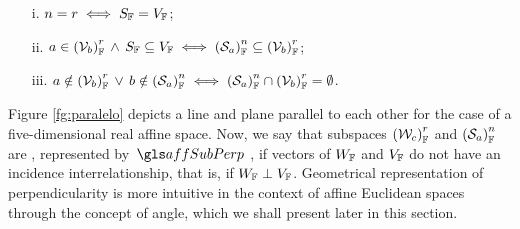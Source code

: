 \begin{itemize}
	\setlength\itemsep{.1em}
	\item[i.] $n=r\iff S_\cam{F}=V_\cam{F}$;
	\item[ii.] $a\in \eamsd{V}{F}{b}{r}\,\wedge\, S_\cam{F}\subseteq V_\cam{F}\iff\eamsd{S}{F}{a}{n}\subseteq\eamsd{V}{F}{b}{r}$;
	\item[iii.] $a\notin \eamsd{V}{F}{b}{r}\,\vee\, b\notin \eamsd{S}{F}{a}{n} \iff \eamsd{S}{F}{a}{n}\cap\eamsd{V}{F}{b}{r}=\emptyset$.
\end{itemize}
Figure \ref{fg:paralelo} depicts a line and plane parallel to each other for the case of a fi\-ve-di\-men\-sio\-nal real affine space. Now, we say that subspaces $\eamsd{W}{F}{c}{r}$ and $\eamsd{S}{F}{a}{n}$ are , represented by $\gloref{affSubPerp}\,$, if vectors of $W_\cam{F}$ and $V_\cam{F}$ do not have an incidence interrelationship, that is, if $W_\cam{F}\perp V_\cam{F}$. Geometrical representation of perpendicularity is more intuitive in the context of affine Euclidean spaces through the concept of angle, which we shall present later in this section.

